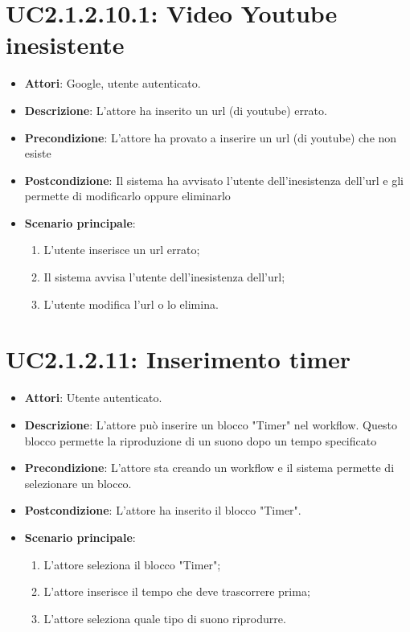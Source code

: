 \section{UC2.1.2.10.1: Video Youtube inesistente}
\label{UC2.1.2.10.1}
\begin{itemize}
	\item \textbf{Attori}: Google, utente autenticato.
	\item \textbf{Descrizione}: L'attore ha inserito un url (di youtube) errato.
	\item \textbf{Precondizione}: L'attore ha provato a inserire un url (di youtube) che non esiste
	\item \textbf{Postcondizione}: Il sistema ha avvisato l'utente dell'inesistenza dell'url e gli permette di modificarlo oppure eliminarlo
	\item \textbf{Scenario principale}:
	\begin{enumerate} \item L'utente inserisce un url errato;  \item  Il sistema avvisa l'utente dell'inesistenza dell'url;  \item  L'utente modifica l'url o lo elimina.\end{enumerate}
\end{itemize}

\section{UC2.1.2.11: Inserimento timer}
\label{UC2.1.2.11}
\begin{itemize}
	\item \textbf{Attori}: Utente autenticato.
	\item \textbf{Descrizione}: L'attore può inserire un blocco "Timer" nel workflow. Questo blocco permette la riproduzione di un suono dopo un tempo specificato
	\item \textbf{Precondizione}: L'attore sta creando un workflow e il sistema permette di selezionare un blocco.
	\item \textbf{Postcondizione}: L'attore ha inserito il blocco "Timer".
	\item \textbf{Scenario principale}:
	\begin{enumerate} \item L'attore seleziona il blocco "Timer";  \item  L'attore inserisce il tempo che deve trascorrere prima;  \item  L'attore seleziona quale tipo di suono riprodurre.\end{enumerate}
\end{itemize}

